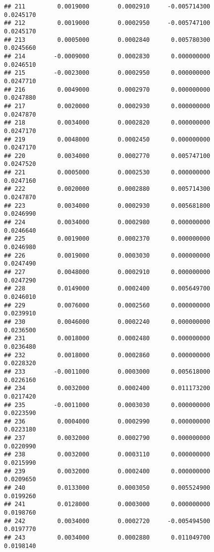 \documentclass[
]{article}
\begin{document}
\begin{verbatim}
## 211         0.0019000        0.0002910     -0.005714300             0.0245170
## 212         0.0019000        0.0002950     -0.005747100             0.0245170
## 213         0.0005000        0.0002840      0.005780300             0.0245660
## 214        -0.0009000        0.0002830      0.000000000             0.0246510
## 215        -0.0023000        0.0002950      0.000000000             0.0247710
## 216         0.0049000        0.0002970      0.000000000             0.0247880
## 217         0.0020000        0.0002930      0.000000000             0.0247870
## 218         0.0034000        0.0002820      0.000000000             0.0247170
## 219         0.0048000        0.0002450      0.000000000             0.0247170
## 220         0.0034000        0.0002770      0.005747100             0.0247520
## 221         0.0005000        0.0002530      0.000000000             0.0247160
## 222         0.0020000        0.0002880      0.005714300             0.0247870
## 223         0.0034000        0.0002930      0.005681800             0.0246990
## 224         0.0034000        0.0002980      0.000000000             0.0246640
## 225         0.0019000        0.0002370      0.000000000             0.0246980
## 226         0.0019000        0.0003030      0.000000000             0.0247490
## 227         0.0048000        0.0002910      0.000000000             0.0247290
## 228         0.0149000        0.0002400      0.005649700             0.0246010
## 229         0.0076000        0.0002560      0.000000000             0.0239910
## 230         0.0046000        0.0002240      0.000000000             0.0236500
## 231         0.0018000        0.0002480      0.000000000             0.0236480
## 232         0.0018000        0.0002860      0.000000000             0.0228320
## 233        -0.0011000        0.0003000      0.005618000             0.0226160
## 234         0.0032000        0.0002400      0.011173200             0.0217420
## 235        -0.0011000        0.0003030      0.000000000             0.0223590
## 236         0.0004000        0.0002990      0.000000000             0.0223180
## 237         0.0032000        0.0002790      0.000000000             0.0220990
## 238         0.0032000        0.0003110      0.000000000             0.0215990
## 239         0.0032000        0.0002400      0.000000000             0.0209650
## 240         0.0133000        0.0003050      0.005524900             0.0199260
## 241         0.0128000        0.0003000      0.000000000             0.0198760
## 242         0.0034000        0.0002720     -0.005494500             0.0197770
## 243         0.0034000        0.0002880      0.011049700             0.0198140

\end{verbatim}
\end{document}
